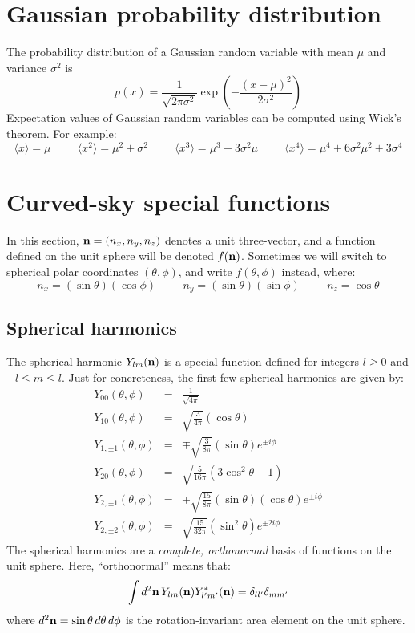 \documentclass[aps,prd,superscriptaddress,groupedaddress,nofootinbib,nobibnotes]{revtex4}
\newcommand{\be}{\begin{equation}}
\newcommand{\ee}{\end{equation}}
\newcommand{\ba}{\begin{eqnarray}}
\newcommand{\ea}{\end{eqnarray}}
\newcommand{\nn}{\nonumber}
\def\n{{\bf n}}
\begin{document}
\appendix

\section{Gaussian probability distribution}
\label{app:gaussian}

\par\noindent
The probability distribution of a Gaussian random variable with mean $\mu$ and variance $\sigma^2$ is
\be
p(x) = \frac{1}{\sqrt{2\pi\sigma^2}} \exp\left( - \frac{(x-\mu)^2}{2\sigma^2} \right)
\ee
Expectation values of Gaussian random variables can be computed using Wick's theorem.
For example:
\be
\langle x \rangle = \mu
  \hspace{1cm}
\langle x^2 \rangle = \mu^2 + \sigma^2
  \hspace{1cm}
\langle x^3 \rangle = \mu^3 + 3 \sigma^2 \mu
  \hspace{1cm}
\langle x^4 \rangle = \mu^4 + 6 \sigma^2 \mu^2 + 3 \sigma^4
\ee

\section{Curved-sky special functions}
\label{app:curved_sky}

In this section, $\n = (n_x, n_y, n_z)$ denotes a unit three-vector, and a function
defined on the unit sphere will be denoted $f(\n)$.  Sometimes we will switch to 
spherical polar coordinates $(\theta,\phi)$, and write $f(\theta,\phi)$ instead,
where:
\be
n_x = (\sin\theta)(\cos\phi)
  \hspace{1cm}
n_y = (\sin\theta)(\sin\phi)
  \hspace{1cm}
n_z = \cos\theta
\ee

\subsection{Spherical harmonics}

The spherical harmonic $Y_{lm}(\n)$ is a special function defined for integers $l \ge 0$
and $-l \le m \le l$.  Just for concreteness, the first few spherical harmonics are given by:
\ba
Y_{00}(\theta,\phi) &=& \frac{1}{\sqrt{4\pi}} \nn \\
Y_{10}(\theta,\phi) &=& \sqrt{\frac{3}{4\pi}} (\cos\theta) \nn \\
Y_{1,\pm 1}(\theta,\phi) &=& \mp \sqrt{\frac{3}{8\pi}} (\sin\theta) e^{\pm i\phi} \nn \\
Y_{20}(\theta,\phi) &=& \sqrt{\frac{5}{16\pi}} (3 \cos^2\theta - 1) \nn  \\
Y_{2,\pm 1}(\theta,\phi) &=& \mp \sqrt{\frac{15}{8\pi}} (\sin\theta) (\cos\theta) e^{\pm i \phi} \nn \\
Y_{2,\pm 2}(\theta,\phi) &=& \sqrt{\frac{15}{32\pi}} (\sin^2\theta) e^{\pm 2 i \phi}
\ea
The spherical harmonics are a {\em complete, orthonormal} basis of functions on the unit sphere.
Here, ``orthonormal'' means that:
\be
\int d^2\n \, Y_{lm}(\n) Y_{l'm'}^*(\n) = \delta_{ll'} \delta_{mm'}  \label{eq:ylm_orth}
\ee
where $d^2\n = \sin\theta \, d\theta \, d\phi$ is the rotation-invariant area element on the unit sphere.
\end{document}
